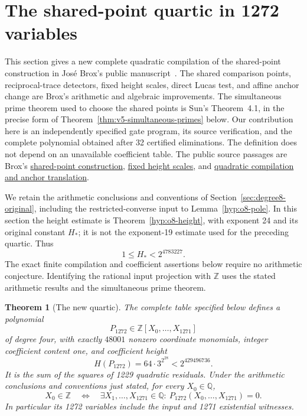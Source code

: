 \documentclass[11pt]{article}
\newtheorem{theorem}{Theorem}[section]
\theoremstyle{definition}
\theoremstyle{remark}
\newcommand{\Q}{\mathbb Q}
\newcommand{\Z}{\mathbb Z}
\begin{document}
\section{The shared-point quartic in 1272 variables}
\label{sec:v5-1272}

This section gives a new complete quadratic compilation of the shared-point
construction in Jos\'e Brox's public manuscript~\cite{Brox2026}.
The shared comparison points, reciprocal-trace detectors, fixed height
scales, direct Lucas test, and affine anchor change are Brox's arithmetic
and algebraic improvements. The simultaneous prime theorem used to choose
the shared points is Sun's Theorem~4.1, in the precise form of
Theorem~\ref{thm:v5-simultaneous-primes} below. Our contribution here is an
independently specified gate program, its source verification, and the
complete polynomial obtained after 32 certified eliminations. The
definition does not depend on an unavailable coefficient table.
The public source passages are Brox's
\href{https://github.com/JoseBrox/diophantine-z-q_improvements/blob/f4d1b5e6c23d4adeb3ae1f986ab0bf87884bdff6/paper/diophantine_optimization_20261106_v3.tex#L2354-L3044}{shared-point construction},
\href{https://github.com/JoseBrox/diophantine-z-q_improvements/blob/f4d1b5e6c23d4adeb3ae1f986ab0bf87884bdff6/paper/diophantine_optimization_20261106_v3.tex#L3352-L3405}{fixed height scales},
and
\href{https://github.com/JoseBrox/diophantine-z-q_improvements/blob/f4d1b5e6c23d4adeb3ae1f986ab0bf87884bdff6/paper/diophantine_optimization_20261106_v3.tex#L4135-L4758}{quadratic compilation and anchor translation}.

We retain the arithmetic conclusions and conventions of
Section~\ref{sec:degree8-original}, including the restricted-converse
input to Lemma~\ref{hyp:o8-pole}. In this section the height estimate is
Theorem~\ref{hyp:o8-height}, with exponent 24 and its original constant
$H_*$; it is not the exponent-19 estimate used for the preceding quartic.
Thus
\[
  1\le H_*<2^{4783227}.
\]
The exact finite compilation and coefficient assertions below require no
arithmetic conjecture. Identifying the rational input projection with
$\Z$ uses the stated arithmetic results and the simultaneous prime theorem.

\begin{theorem}[The new quartic]\label{thm:v5-1272-polynomial}
The complete table specified below defines a polynomial
\[
 P_{1272}\in\Z[X_0,\ldots,X_{1271}]
\]
of degree four, with exactly $48001$ nonzero coordinate monomials,
integer coefficient content one, and coefficient height
\[
 H(P_{1272})=64\cdot3^{2^{28}}<2^{429496736}.
\]
It is the sum of the squares of 1229 quadratic residuals. Under the
arithmetic conclusions and conventions just stated, for every $X_0\in\Q$,
\[
 X_0\in\Z\quad\Longleftrightarrow\quad
 \exists X_1,\ldots,X_{1271}\in\Q:\ P_{1272}(X_0,\ldots,X_{1271})=0.
\]
In particular its 1272 variables include the input and 1271 existential
witnesses.
\end{theorem}
\end{document}
